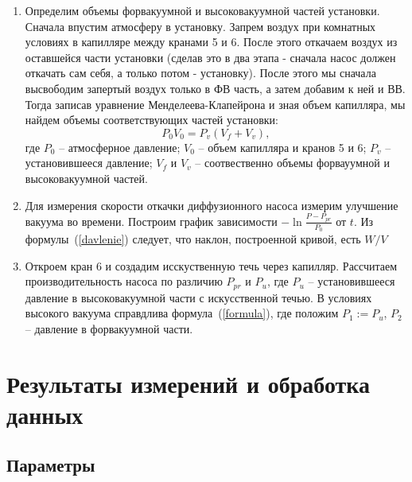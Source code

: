 \documentclass[a4paper,12pt]{article} %
\begin{document}
\begin{enumerate}

	\item
		Определим объемы форвакуумной и высоковакуумной частей установки. Сначала впустим атмосферу в установку. Запрем воздух при комнатных условиях в капилляре между кранами 5 и 6. После этого откачаем воздух из оставшейся части установки (сделав это в два этапа - сначала насос должен откачать сам себя, а только потом - установку). После этого мы сначала высвободим запертый воздух только в ФВ часть, а затем добавим к ней и ВВ. Тогда записав уравнение Менделеева-Клапейрона и зная объем капилляра, мы найдем объемы соответствующих частей установки:
	\begin{equation}
		P_0 V_0 = P_v (V_f + V_v),
	\end{equation}
	где $P_0$ -- атмосферное давление; $V_0$ -- объем капилляра и кранов 5 и 6; $P_v$ -- установившееся давление; $V_f$ и $V_v$ -- соотвественно объемы форвауумной и высоковакуумной частей.
		
	\item
		Для измерения скорости откачки диффузионного насоса измерим улучшение вакуума во времени. Построим график зависимости $-\ln{\frac{P-P_{pr}}{P_0}}$ от $t$. Из формулы~(\ref{davlenie}) следует, что наклон, построенной кривой, есть $W / V$
	
	\item
		Откроем кран 6 и создадим исскуственную течь через капилляр. Рассчитаем производительность насоса по различию $P_{pr}$ и $P_u$, где $P_u$ -- установившееся давление в высоковакуумной части с искусственной течью. В условиях высокого вакуума справдлива формула~(\ref{formula}), где положим $P_1 := P_u$, $P_2$ -- давление в форвакуумной части. 
	
\end{enumerate}

\section{Результаты измерений и обработка данных}

\subsection*{Параметры}
\end{document}
